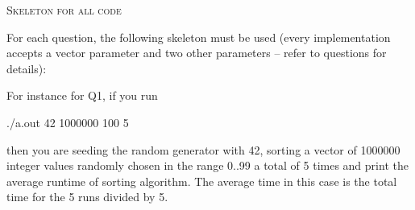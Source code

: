 \textsc{Skeleton for all code}

For each question, the following skeleton must be used (every implementation
accepts a vector parameter and two other parameters --
refer to questions for details):
{\footnotesize
{}
}

For instance for Q1, if you run 
\begin{console}[fontsize=\footnotesize]
./a.out 42 1000000 100 5
\end{console}
then you are seeding the random generator with 42, sorting a vector
of 1000000 integer values randomly chosen in the range 0..99
a total of 5 times and print the
average runtime of sorting algorithm.
The average time in this case is the total time for the 5 runs 
divided by 5.
